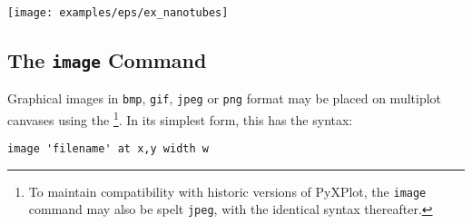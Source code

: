{{}\\{\footnotesize
{}\newline
{}\newline
}\\{\footnotesize
{}\newline
\noindent{\tt \phantom{x}\{}\newline
{}\newline
\noindent{\tt \phantom{xxx}\{}\newline
{}\newline
{}\newline
{}\newline
{}\newline
{}\newline
{}\newline
{}\newline
\noindent{\tt \phantom{xxx}\}}\newline
\noindent{\tt \phantom{x}\}}\newline
}\\{\footnotesize
{}\newline
{}}
\nlscf
\centerline{\texttt{[image: examples/eps/ex\_nanotubes]}}
}

\subsection{The {\tt image} Command}

Graphical images in {\tt bmp}, {\tt gif}, {\tt jpeg} or {\tt png} format may be
placed on multiplot canvases using the \footnote{To maintain
compatibility with historic versions of PyXPlot, the {\tt image} command may
also be spelt {\tt jpeg}, with the identical syntax thereafter.}. In its
simplest form, this has the syntax:
\begin{verbatim}
image 'filename' at x,y width w
\end{verbatim}

